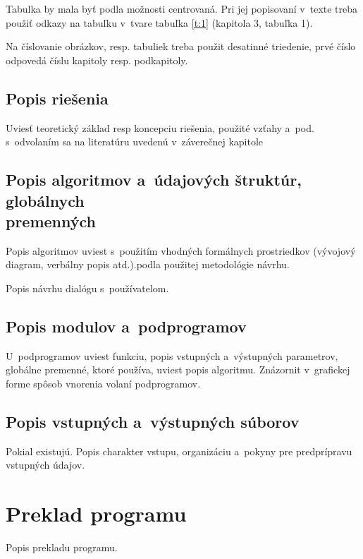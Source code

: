 \documentclass[a4paper]{systemovaPrirucka}
\begin{document}
Tabulka by mala byť podla možnosti centrovaná. Pri jej popisovaní v~texte treba použiť odkazy na tabuľku v~tvare tabuľka \ref{t:1} (kapitola 3, tabuľka 1).

Na číslovanie obrázkov, resp. tabuliek treba použit desatinné triedenie, prvé číslo odpovedá číslu kapitoly resp. podkapitoly.

\subsection{Popis riešenia}

Uviesť teoretický základ resp koncepciu riešenia, použité vzťahy a~pod. s~odvolaním sa na literatúru uvedenú v~záverečnej kapitole

\subsection[Popis  algoritmov a~údajových štruktúr, globálnych premenných]{Popis  algoritmov a~údajových štruktúr, globálnych\\ premenných}

Popis algoritmov uviest s~použitím vhodných formálnych prostriedkov (vývojový diagram, verbálny popis atd.).podla použitej metodológie návrhu.

Popis návrhu dialógu s~používatelom. 

\subsection{Popis modulov a~podprogramov}

U~podprogramov uviest funkciu, popis vstupných a~výstupných parametrov, globálne premenné, ktoré používa, uviest popis algoritmu. Znázornit v~grafickej forme spôsob vnorenia volaní podprogramov.

\subsection{Popis vstupných a~výstupných súborov}

Pokial existujú. Popis charakter vstupu, organizáciu a~pokyny pre predprípravu  vstupných údajov.

\newpage\section{Preklad programu}

Popis prekladu programu.
\end{document}
